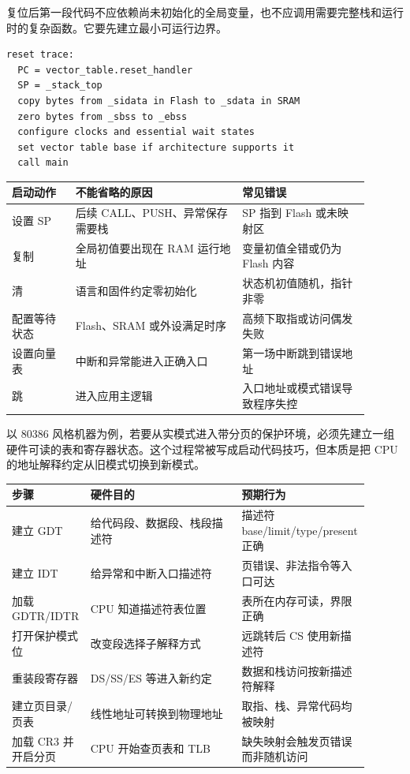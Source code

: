 复位后第一段代码不应依赖尚未初始化的全局变量，也不应调用需要完整栈和运行时的复杂函数。它要先建立最小可运行边界。

\begin{lstlisting}
reset trace:
  PC = vector_table.reset_handler
  SP = _stack_top
  copy bytes from _sidata in Flash to _sdata in SRAM
  zero bytes from _sbss to _ebss
  configure clocks and essential wait states
  set vector table base if architecture supports it
  call main
\end{lstlisting}

\begin{longtable}{L{0.16\linewidth}L{0.42\linewidth}L{0.32\linewidth}}
\toprule
启动动作 & 不能省略的原因 & 常见错误 \\
\midrule
设置 SP & 后续 CALL、PUSH、异常保存需要栈 & SP 指到 Flash 或未映射区 \\
复制  & 全局初值要出现在 RAM 运行地址 & 变量初值全错或仍为 Flash 内容 \\
清  & 语言和固件约定零初始化 & 状态机初值随机，指针非零 \\
配置等待状态 & Flash、SRAM 或外设满足时序 & 高频下取指或访问偶发失败 \\
设置向量表 & 中断和异常能进入正确入口 & 第一场中断跳到错误地址 \\
跳  & 进入应用主逻辑 & 入口地址或模式错误导致程序失控 \\
\bottomrule
\end{longtable}

以 80386 风格机器为例，若要从实模式进入带分页的保护环境，必须先建立一组硬件可读的表和寄存器状态。这个过程常被写成启动代码技巧，但本质是把 CPU 的地址解释约定从旧模式切换到新模式。

\begin{longtable}{L{0.16\linewidth}L{0.42\linewidth}L{0.32\linewidth}}
\toprule
步骤 & 硬件目的 & 预期行为 \\
\midrule
建立 GDT & 给代码段、数据段、栈段描述符 & 描述符 base/limit/type/present 正确 \\
建立 IDT & 给异常和中断入口描述符 & 页错误、非法指令等入口可达 \\
加载 GDTR/IDTR & CPU 知道描述符表位置 & 表所在内存可读，界限正确 \\
打开保护模式位 & 改变段选择子解释方式 & 远跳转后 CS 使用新描述符 \\
重装段寄存器 & DS/SS/ES 等进入新约定 & 数据和栈访问按新描述符解释 \\
建立页目录/页表 & 线性地址可转换到物理地址 & 取指、栈、异常代码均被映射 \\
加载 CR3 并开启分页 & CPU 开始查页表和 TLB & 缺失映射会触发页错误而非随机访问 \\
\bottomrule
\end{longtable}


